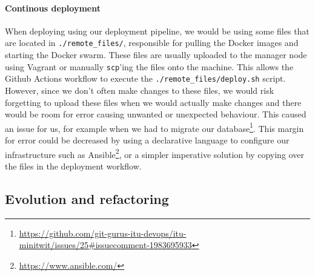 \documentclass{article}
\begin{document}
\paragraph{Continous deployment}
When deploying using our deployment pipeline, we would be using some files that are located in \texttt{./remote\_files/}, responsible for pulling the Docker images and starting the Docker swarm. These files are usually uploaded to the manager node using Vagrant or manually \texttt{scp}'ing the files onto the machine. This allows the Github Actions workflow to execute the \texttt{./remote\_files/deploy.sh} script.
However, since we don't often make changes to these files, we would risk forgetting to upload these files when we would actually make changes and there would be room for error causing unwanted or unexpected behaviour.
This caused an issue for us, for example when we had to migrate our database\footnote{\href{https://github.com/git-gurus-itu-devops/itu-minitwit/issues/25\#issuecomment-1983695933}{https://github.com/git-gurus-itu-devops/itu-minitwit/issues/25\#issuecomment-1983695933}}. This margin for error could be decreased by using a declarative language to configure our infrastructure such as Ansible\footnote{\href{https://www.ansible.com/}{https://www.ansible.com/}}, or a simpler imperative solution by copying over the files in the deployment workflow.



\subsection{Evolution and refactoring}
\end{document}
